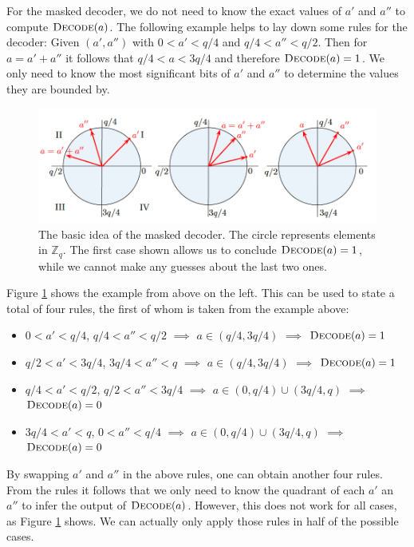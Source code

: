 For the masked decoder, we do not need to know the exact values of \(a'\) and \(a''\) to compute \(\textsc{Decode}(a)\). The following example helps to lay down some rules for the decoder: Given \((a', a'')\) with \(0 < a' < q/4\) and \(q/4 < a'' < q/2\). Then for \(a=a'+a''\) it follows that \(q/4 < a < 3q/4\) and therefore \(\textsc{Decode}(a)=1\). We only need to know the most significant bits of \(a'\) and \(a''\) to determine the values they are bounded by.
\begin{figure}[H]
	\centering
	\includegraphics[width=\textwidth]{maskedDecoder_1.png}
	\caption{The basic idea of the masked decoder. The circle represents elements in \(\mathbb{Z}_q\). The first case shown allows us to conclude \(\textsc{Decode}(a)=1\), while we cannot make any guesses about the last two ones. \cite{maskedRing}}
	\label{maskedDecoder_1}
\end{figure}
Figure \ref{maskedDecoder_1} shows the example from above on the left. This can be used to state a total of four rules, the first of whom is taken from the example above:
\begin{itemize}
\item \(0 < a' < q/4\), \(q/4 < a'' < q/2\) \(\implies\) \(a \in (q/4,3q/4)\) \(\implies\) \(\textsc{Decode}(a)=1\)
\item \(q/2 < a' < 3q/4\), \(3q/4 < a'' < q\) \(\implies\) \(a \in (q/4,3q/4)\) \(\implies\) \(\textsc{Decode}(a)=1\)
\item \(q/4 < a' < q/2\), \(q/2 < a'' < 3q/4\) \(\implies\) \(a \in (0,q/4) \cup (3q/4,q)\) \(\implies\) \(\textsc{Decode}(a)=0\)
\item \(3q/4 < a' < q\), \(0 < a'' < q/4\) \(\implies\) \(a \in (0,q/4) \cup (3q/4,q)\) \(\implies\) \(\textsc{Decode}(a)=0\)
\end{itemize}
By swapping \(a'\) and \(a''\) in the above rules, one can obtain another four rules. From the rules it follows that we only need to know the quadrant of each \(a'\) an \(a''\) to infer the output of \(\textsc{Decode}(a)\). However, this does not work for all cases, as Figure \ref{maskedDecoder_1} shows. We can actually only apply those rules in half of the possible cases.


